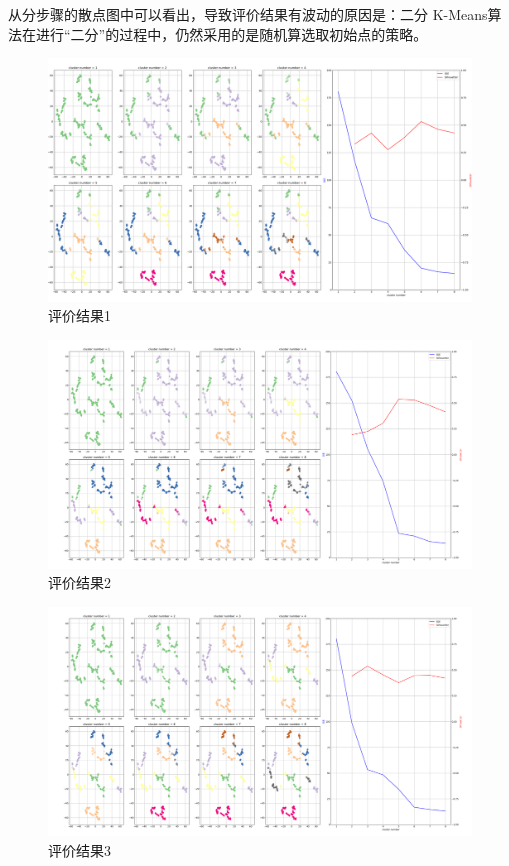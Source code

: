 \documentclass[a4paper,11pt]{article}%
\theoremstyle{remark}
\theoremstyle{remark}
\theoremstyle{definition}
\theoremstyle{definition}
\theoremstyle{definition}
\begin{document}
从分步骤的散点图中可以看出，导致评价结果有波动的原因是：二分 K-Means算法在进行“二分”的过程中，仍然采用的是随机算选取初始点的策略。
\begin{figure}[htbp]
    \begin{adjustbox}{center}
    \includegraphics[scale=0.30]{Figure_1.png}
    \end{adjustbox}
    \caption{评价结果1}
\end{figure}
\begin{figure}[H]
    \begin{adjustbox}{center}
    \includegraphics[scale=0.30]{Figure_2.png}
    \end{adjustbox}
    \caption{评价结果2}
\end{figure}
\begin{figure}[H]
    \begin{adjustbox}{center}
    \includegraphics[scale=0.30]{Figure_3.png}
    \end{adjustbox}
    \caption{评价结果3}
\end{figure}
\end{document}
